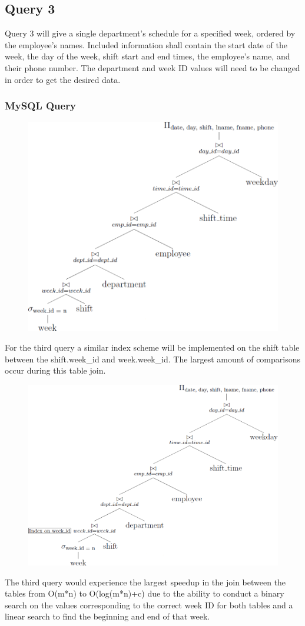 \documentclass[letter,12pt]{texMemo}
\begin{document}
\subsection*{Query 3}
Query 3 will give a single department's schedule for a specified week, ordered by the employee's names. Included information shall contain the start date of the week, the day of the week, shift start and end times, the employee's name, and their phone number. The department and week ID values will need to be changed in order to get the desired data.\subsubsection*{MySQL Query}
	
\begin{figure}[H]
	\centering
	\includegraphics[width=.6\textwidth]{query3.png}
\end{figure}
For the third query a similar index scheme will be implemented on the shift table between the shift.week\_id and week.week\_id. The largest amount of comparisons occur during this table join. 
\begin{figure}[H]
	\centering
	\includegraphics[width=.6\textwidth]{query3_indexed.png}
\end{figure}
The third query would experience the largest speedup in the join between the tables from O(m*n) to O(log(m*n)+c) due to the ability to conduct a binary search on the values corresponding to the correct week ID for both tables and a linear search to find the beginning and end of that week.
\vspace{1em}
\end{document}
